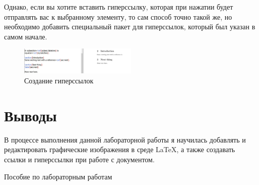 \documentclass[a4paper,12pt]{article}
\begin{document}
Однако, если вы хотите вставить гиперссылку, которая при нажатии будет отправлять вас к выбранному элементу, то сам способ точно такой же, но необходимо добавить специальный пакет для гиперссылок, который был указан в самом начале.

\begin{figure}[h]
\centering
\includegraphics[width=0.5\textwidth]{8.JPG}
\caption{Создание гиперссылок}
\label{fig:hyperlinks}
\end{figure}

\section{Выводы}

В процессе выполнения данной лабораторной работы я научилась добавлять и редактировать графические изображения в среде \LaTeX, а также создавать ссылки и гиперссылки при работе с документом.

\begin{thebibliography}{9}
Пособие по лабораторным работам
\end{thebibliography}
\end{document}
